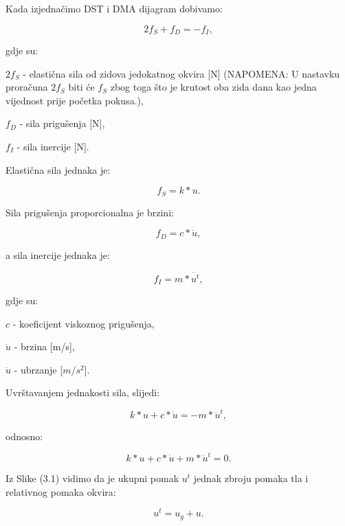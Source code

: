 \documentclass[12pt]{book}
\begin{document}
Kada izjednačimo DST i DMA dijagram dobivamo:

\begin{equation}\label{Jednadžba 3.1}
	2f_S + f_D = - f_I,
\end{equation}

gdje su:

$2f_S$ - elastična sila od zidova jedokatnog okvira [N] (NAPOMENA: U nastavku proračuna $2f_S$ biti će $f_S$ zbog toga što je krutost oba zida dana kao jedna vijednost prije početka pokusa.),

$f_D$ - sila prigušenja [N],

$f_I$ - sila inercije [N].

Elastična sila jednaka je:

\begin{equation}\label{Jednadzba 3.2}
	f_S = k*u.
\end{equation}

Sila prigušenja proporcionalna je brzini:

\begin{equation}\label{Jednadzba 3.3}
	f_D = c*\dot{u},
\end{equation}

a sila inercije jednaka je:

\begin{equation}\label{Jednadzba 3.4}
	f_I = m * \ddot{u^t},
\end{equation}

gdje su:

$c$ - koeficijent viskoznog prigušenja,

$\dot{u}$ - brzina [m/s],

$\ddot{u}$ - ubrzanje [$m/s^2$].

\newpage

Uvrštavanjem jednakosti sila, slijedi:

\begin{equation}\label{Jednadzba 3.5}
	k*u + c*\dot{u} = - m*\ddot{u}^t,
\end{equation}

odnosno:

\begin{equation}\label{Jednadzba 3.6}
	k*u + c*\dot{u} + m*\ddot{u}^t =0.
\end{equation}

Iz Slike (3.1) vidimo da je ukupni pomak $u^t$ jednak zbroju pomaka tla i relativnog pomaka okvira:

\begin{equation}\label{Jednadzba 3.7}
	u^t = u_g + u.
\end{equation}
\end{document}
